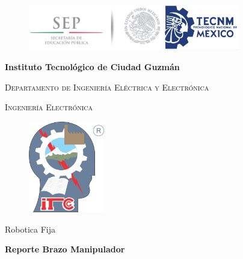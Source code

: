 \documentclass[12pt,a4paper]{article}
\begin{document}
\renewcommand{\listtablename}{Indice de tablas}
\renewcommand{\tablename}{Tabla}
\begin{titlepage}

    \begin{figure}[h]
 	\centering
    	{\includegraphics[height=2cm]{SEP_logo}}
    	\hspace{6cm}
    	{\includegraphics[height=2cm]{TecNM}}
    \end{figure}
    
    \centering
    \vspace{1cm}
    {\Large\bfseries Instituto Tecnológico de Ciudad Guzmán\par \vspace{.5cm}}
    {\Large \scshape Departamento de Ingeniería Eléctrica y Electrónica \par \vspace{.5cm}}
    {\Large \scshape Ingeniería Electrónica \par \vspace{.5cm}}
    \begin{figure}[h]
    \centering
     \includegraphics[height=4cm]{logo}
    \end{figure}
    \par \vspace{.2cm}
   
	{\huge Robotica Fija\par\vspace{.5cm}}
	{\Large\bfseries Reporte Brazo Manipulador\\ \par\vspace{1cm}}
	

\end{titlepage}
\end{document}

